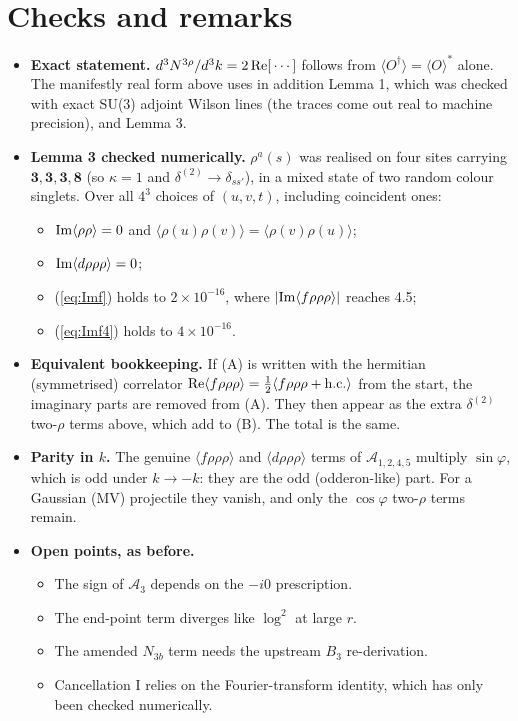\documentclass[10pt]{article}
\begin{document}
\section{Checks and remarks}
\begin{itemize}
\item \textbf{Exact statement.} $d^{3}N^{3\rho}/d^{3}k=2\,{\rm Re}[\,\cdots]$ follows from $\langle O^{\dagger}\rangle=\langle O\rangle^{*}$ alone. The manifestly real form above uses in addition Lemma 1, which was checked with exact SU(3) adjoint Wilson lines (the traces come out real to machine precision), and Lemma 3.
\item \textbf{Lemma 3 checked numerically.} $\rho^{a}(s)$ was realised on four sites carrying $\mathbf{3},\mathbf{3},\mathbf{3},\mathbf{8}$ (so $\kappa=1$ and $\delta^{(2)}\to\delta_{ss'}$), in a mixed state of two random colour singlets. Over all $4^{3}$ choices of $(u,v,t)$, including coincident ones:
\begin{itemize}
\item ${\rm Im}\langle\rho\rho\rangle=0$ and $\langle\rho(u)\rho(v)\rangle=\langle\rho(v)\rho(u)\rangle$;
\item ${\rm Im}\langle d\rho\rho\rho\rangle=0$;
\item (\ref{eq:Imf}) holds to $2\times10^{-16}$, where $|{\rm Im}\langle f\rho\rho\rho\rangle|$ reaches 4.5;
\item (\ref{eq:Imf4}) holds to $4\times10^{-16}$.
\end{itemize}
\item \textbf{Equivalent bookkeeping.} If (A) is written with the hermitian (symmetrised) correlator ${\rm Re}\langle f\rho\rho\rho\rangle=\tfrac12\langle f\rho\rho\rho+{\rm h.c.}\rangle$ from the start, the imaginary parts are removed from (A). They then appear as the extra $\delta^{(2)}$ two-$\rho$ terms above, which add to (B). The total is the same.
\item \textbf{Parity in $k$.} The genuine $\langle f\rho\rho\rho\rangle$ and $\langle d\rho\rho\rho\rangle$ terms of $\mathcal{A}_{1,2,4,5}$ multiply $\sin\varphi$, which is odd under $k\to-k$: they are the odd (odderon-like) part. For a Gaussian (MV) projectile they vanish, and only the $\cos\varphi$ two-$\rho$ terms remain.
\item \textbf{Open points, as before.}
\begin{itemize}
\item The sign of $\mathcal{A}_{3}$ depends on the $-i0$ prescription.
\item The end-point term diverges like $\log^{2}$ at large $r$.
\item The amended $N_{3b}$ term needs the upstream $B_{3}$ re-derivation.
\item Cancellation I relies on the Fourier-transform identity, which has only been checked numerically.
\end{itemize}
\end{itemize}
\end{document}
